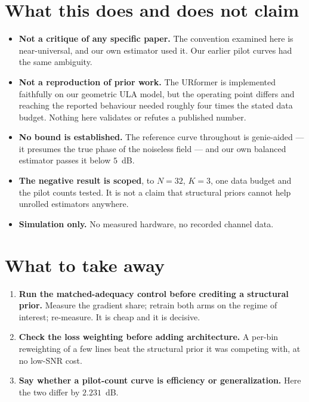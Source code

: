 \documentclass[11pt]{article}
\begin{document}
\section{What this does and does not claim}

\begin{itemize}
\item \textbf{Not a critique of any specific paper.} The convention examined
here is near-universal, and our own estimator used it. Our earlier pilot curves
had the same ambiguity.
\item \textbf{Not a reproduction of prior work.} The URformer is implemented
faithfully on our geometric ULA model, but the operating point differs and
reaching the reported behaviour needed roughly four times the stated data
budget. Nothing here validates or refutes a published number.
\item \textbf{No bound is established.} The reference curve throughout is
genie-aided --- it presumes the true phase of the noiseless field --- and our
own balanced estimator passes it below $5$~dB.
\item \textbf{The negative result is scoped}, to $N=32$, $K=3$, one data budget
and the pilot counts tested. It is not a claim that structural priors cannot
help unrolled estimators anywhere.
\item \textbf{Simulation only.} No measured hardware, no recorded channel data.
\end{itemize}

\section{What to take away}

\begin{enumerate}
\item \textbf{Run the matched-adequacy control before crediting a structural
prior.} Measure the gradient share; retrain both arms on the regime of
interest; re-measure. It is cheap and it is decisive.
\item \textbf{Check the loss weighting before adding architecture.} A per-bin
reweighting of a few lines beat the structural prior it was competing with, at
no low-SNR cost.
\item \textbf{Say whether a pilot-count curve is efficiency or
generalization.} Here the two differ by $2.231$~dB.
\end{enumerate}
\end{document}
